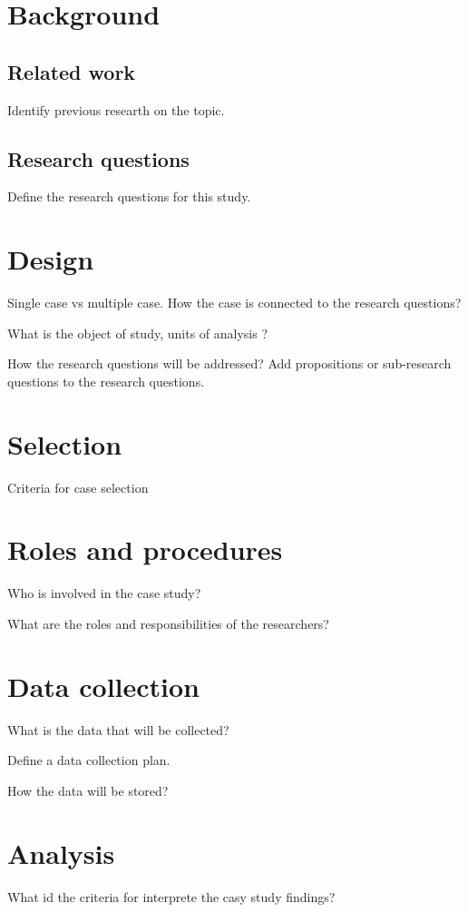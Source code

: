 \section{Background}
\label{sec:background}


\subsection{Related work}
\label{subsec:relatedwork}
Identify previous researth on the topic.

\subsection{Research questions}
\label{subsec:rqs}
Define the research questions for this study. 

\section{Design}
\label{sec:design}
Single case vs multiple case. How the case is connected to the research questions?

What is the object of study, units of analysis ?

How the research questions will be addressed? Add propositions or sub-research questions to the research questions. 

\section{Selection}
\label{sec:selection}
Criteria for case selection

\section{Roles and procedures}
\label{sec:roles}
Who is involved in the case study?

What are the roles and responsibilities of the researchers?


\section{Data collection}
\label{sec:datacollection}
What is the data that will be collected?

Define a data collection plan.

How the data will be stored?

\section{Analysis}
\label{sec:analysis}
What id the criteria for interprete the casy study findings?

